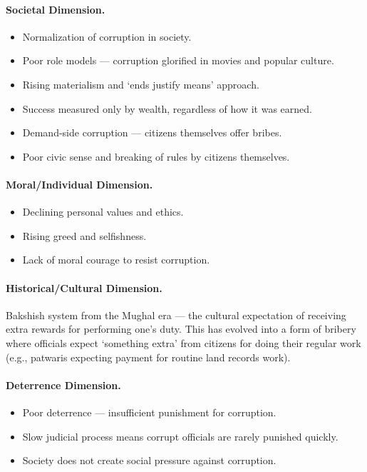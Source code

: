 \paragraph{Societal Dimension.}
\begin{itemize}
\item Normalization of corruption in society.
\item Poor role models --- corruption glorified in movies and popular culture.
\item Rising materialism and `ends justify means' approach.
\item Success measured only by wealth, regardless of how it was earned.
\item Demand-side corruption --- citizens themselves offer bribes.
\item Poor civic sense and breaking of rules by citizens themselves.
\end{itemize}

\paragraph{Moral/Individual Dimension.}
\begin{itemize}
\item Declining personal values and ethics.
\item Rising greed and selfishness.
\item Lack of moral courage to resist corruption.
\end{itemize}

\paragraph{Historical/Cultural Dimension.} Bakshish system from the Mughal era --- the cultural expectation of receiving extra rewards for performing one's duty. This has evolved into a form of bribery where officials expect `something extra' from citizens for doing their regular work (e.g., patwaris expecting payment for routine land records work).

\paragraph{Deterrence Dimension.}
\begin{itemize}
\item Poor deterrence --- insufficient punishment for corruption.
\item Slow judicial process means corrupt officials are rarely punished quickly.
\item Society does not create social pressure against corruption.
\end{itemize}

